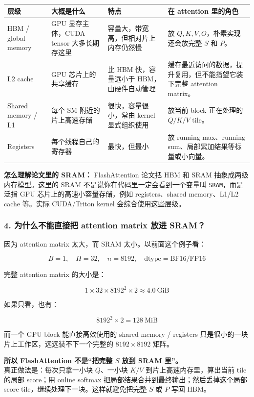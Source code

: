 \begin{center}
{\small
\begin{tabular}{p{2.9cm}p{3.2cm}p{3.4cm}p{3.5cm}}
\hline
\textbf{层级} & \textbf{大概是什么} & \textbf{特点} & \textbf{在 attention 里的角色} \\
\hline
HBM / global memory & GPU 显存主体，CUDA tensor 大多长期存这里 & 容量大，带宽高，但相对片上内存仍然慢 & 放 $Q,K,V,O$，朴素实现还会放完整 $S$ 和 $P$。 \\
L2 cache & GPU 芯片上的共享缓存 & 比 HBM 快，容量远小于 HBM，由硬件自动管理 & 缓存最近访问的数据，提升复用，但不能指望它装下完整 attention matrix。 \\
Shared memory / L1 & 每个 SM 附近的片上高速存储 & 很快，容量很小，常由 kernel 显式组织使用 & 放当前 block 正在处理的 $Q/K/V$ tile。 \\
Registers & 每个线程自己的寄存器 & 最快，但最小 & 放 running max、running sum、局部累加结果等标量或小向量。 \\
\hline
\end{tabular}
}
\end{center}

\begin{intubox}
\textbf{怎么理解论文里的 SRAM：} FlashAttention 论文把 HBM 和 SRAM 抽象成两级内存模型。这里的 SRAM 不是说你在代码里一定会看到一个变量叫 \texttt{SRAM}，而是泛指 GPU 芯片上的高速小容量存储，例如 registers、shared memory、L1/L2 cache 等。实际 CUDA/Triton kernel 会综合使用这些层级。
\end{intubox}

\subsubsection*{4. 为什么不能直接把 attention matrix 放进 SRAM？}

因为 attention matrix 太大，而 SRAM 太小。以前面这个例子看：

\[
B=1,\quad H=32,\quad n=8192,\quad \text{dtype}=\mathrm{BF16/FP16}
\]

完整 attention matrix 的大小是：

\[
1 \times 32 \times 8192^2 \times 2
\approx
4.0\ \mathrm{GiB}
\]

如果只看，也有：

\[
8192^2 \times 2
= 128\ \mathrm{MiB}
\]

而一个 GPU block 能直接高效使用的 shared memory / registers 只是很小的一块片上工作区，远远装不下一个完整的 $8192 \times 8192$ 矩阵。

\begin{warnbox}
\textbf{所以 FlashAttention 不是“把完整 $S$ 放到 SRAM 里”。}\\
真正做法是：每次只拿一小块 $Q$、一小块 $K/V$ 到片上高速内存里，算出当前 tile 的局部 score；用 online softmax 把局部结果合并到最终输出；然后丢掉这个局部 score tile，继续处理下一块。这样就避免把完整 $S$ 或 $P$ 写回 HBM。
\end{warnbox}

